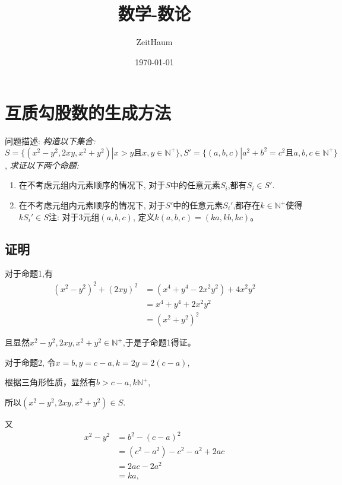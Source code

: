 \documentclass{article}
\title{数学-数论}
\author{ZeitHaum}
\date{\today}
\begin{document}
    \maketitle
    \newpage 
    \tableofcontents
    \newpage
    \setcounter{page}{1}
    \section{互质勾股数的生成方法}
    问题描述: \emph{构造以下集合:}$S = \{(x^2-y^2,2xy,x^2+y^2)| x>y \text{且}x,y\in \mathbb{N}^{+}\}, S' = \{(a,b,c)| a^2+b^2=c^2 \text {且} a,b,c \in \mathbb{N}^{+}\}$,
    \emph{求证以下两个命题:}
    
    \begin{enumerate}[子命题1.]
        \item 在不考虑元组内元素顺序的情况下, 对于$S$中的任意元素$S_i$,都有$S_i \in S'$.
        \item 在不考虑元组内元素顺序的情况下, 对于$S'$中的任意元素$S_i'$,都存在$k\in \mathbb{N}^{+}$使得 $kS_i'\in S$注: 对于3元组$(a,b,c)$, 定义$k(a,b,c) = (ka,kb,kc)$。 
    \end{enumerate}
    
    \subsection{证明}   

    对于命题1,有
    \begin{align*}
        (x^2 - y^2)^2 + (2xy)^2 &=  (x^4 + y^4 - 2x^2y^2) + 4x^2y^2\\
        &= x^4 + y^4 + 2x^2y^2 \\
        &= (x^2 + y^2)^2 
    \end{align*}

    且显然$x^2-y^2,2xy,x^2+y^2 \in \mathbb{N}^{+}$,于是子命题1得证。

    对于命题2, 令$x = b, y = c-a, k = 2y = 2(c-a)$, 

    根据三角形性质，显然有$b > c - a, k \mathbb{N}^{+}$,
    
    所以$(x^2-y^2,2xy,x^2+y^2) \in S$.

    又
    \begin{align*}
        x ^ 2 - y^2 &= b^2 - (c - a)^2 \\
        &= (c^2 - a^2)- c^2 - a^2 + 2ac \\
        &=  2ac - 2a^2 \\
        &= ka,
    \end{align*}
\end{document}
